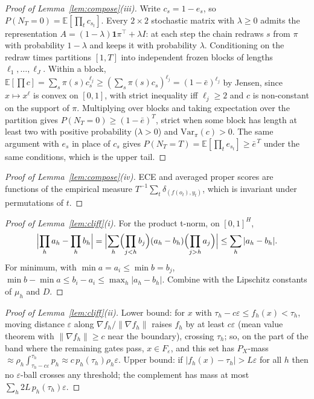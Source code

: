 \documentclass[11pt,a4paper]{article}
\numberwithin{equation}{section}
\theoremstyle{plain}
\theoremstyle{definition}
\theoremstyle{remark}
\newcommand{\E}{\mathbb{E}}
\newcommand{\Var}{\mathrm{Var}}
\newcommand{\norm}[1]{\lVert #1 \rVert}
\begin{document}
\begin{proof}[Proof of Lemma~\ref{lem:compose}(iii)]
Write $c_s=1-e_s$, so $P(N_T=0)=\E[\prod_tc_{s_t}]$. Every $2\times2$ stochastic matrix with $\lambda\ge0$ admits the representation $A=(1-\lambda)\mathbf 1\pi^\top+\lambda I$: at each step the chain redraws $s$ from $\pi$ with probability $1-\lambda$ and keeps it with probability $\lambda$. Conditioning on the redraw times partitions $[1,T]$ into independent frozen blocks of lengths $\ell_1,\dots,\ell_J$. Within a block, $\E[\prod c]=\sum_s\pi(s)c_s^{\ell_j}\ge(\sum_s\pi(s)c_s)^{\ell_j}=(1-\bar e)^{\ell_j}$ by Jensen, since $x\mapsto x^{\ell}$ is convex on $[0,1]$, with strict inequality iff $\ell_j\ge2$ and $c$ is non-constant on the support of $\pi$. Multiplying over blocks and taking expectation over the partition gives $P(N_T=0)\ge(1-\bar e)^T$, strict when some block has length at least two with positive probability ($\lambda>0$) and $\Var_\pi(c)>0$. The same argument with $e_s$ in place of $c_s$ gives $P(N_T=T)=\E[\prod_te_{s_t}]\ge\bar e^{\,T}$ under the same conditions, which is the upper tail.
\end{proof}

\begin{proof}[Proof of Lemma~\ref{lem:compose}(iv)]
ECE and averaged proper scores are functions of the empirical measure $T^{-1}\sum_t\delta_{(f(o_t),y_t)}$, which is invariant under permutations of $t$.
\end{proof}

\begin{proof}[Proof of Lemma~\ref{lem:cliff}(i)]
For the product t-norm, on $[0,1]^H$,
\[
\Bigl|\prod_h a_h-\prod_h b_h\Bigr| = \Bigl|\sum_h\Bigl(\prod_{j<h}b_j\Bigr)(a_h-b_h)\Bigl(\prod_{j>h}a_j\Bigr)\Bigr| \le \sum_h|a_h-b_h| .
\] For minimum, with $\min a=a_i\le\min b=b_j$, $\min b-\min a\le b_i-a_i\le\max_h|a_h-b_h|$. Combine with the Lipschitz constants of $\mu_h$ and $D$.
\end{proof}

\begin{proof}[Proof of Lemma~\ref{lem:cliff}(ii)]
Lower bound: for $x$ with $\tau_h-c\varepsilon\le f_h(x)<\tau_h$, moving distance $\varepsilon$ along $\nabla f_h/\norm{\nabla f_h}$ raises $f_h$ by at least $c\varepsilon$ (mean value theorem with $\norm{\nabla f_h}\ge c$ near the boundary), crossing $\tau_h$; so, on the part of the band where the remaining gates pass, $x\in F_\varepsilon$, and this set has $P_X$-mass $\approx\rho_h\int_{\tau_h-c\varepsilon}^{\tau_h}p_h\approx c\,p_h(\tau_h)\rho_h\varepsilon$. Upper bound: if $|f_h(x)-\tau_h|>L\varepsilon$ for all $h$ then no $\varepsilon$-ball crosses any threshold; the complement has mass at most $\sum_h2L\,p_h(\tau_h)\varepsilon$.
\end{proof}
\end{document}

